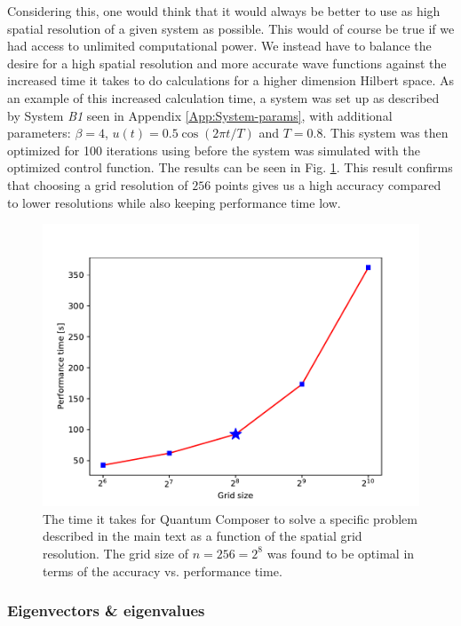\documentclass[a4paper, twocolumn]{revtex4-1}
\begin{document}
Considering this, one would think that it would always be better to use as high spatial resolution of a given system as possible. This would of course be true if we had access to unlimited computational power. We instead have to balance the desire for a high spatial resolution and more accurate wave functions against the increased time it takes to do calculations for a higher dimension Hilbert space. As an example of this increased calculation time, a system was set up as described by System \textit{B1} seen in Appendix \ref{App:System-params}, with additional parameters: $\beta = 4$, $u(t)=0.5 \cos(2\pi t/T)$ and $T=0.8$. This system was then optimized for 100 iterations using  before the system was simulated with the optimized control function. The results can be seen in Fig. \ref{fig:performanceTime}. This result confirms that choosing a grid resolution of $256$ points gives us a high accuracy compared to lower resolutions while also keeping performance time low.

\begin{figure}
	\includegraphics[width=\columnwidth]{graphics/stateAnalysis/PerformanceTime.pdf}
	\caption{The time it takes for Quantum Composer to solve a specific problem described in the main text as a function of the spatial grid resolution. The grid size of $n=256=2^8$ was found to be optimal in terms of the accuracy vs. performance time.}
	\label{fig:performanceTime}
\end{figure}

\subsubsection{Eigenvectors \& eigenvalues}
\end{document}

